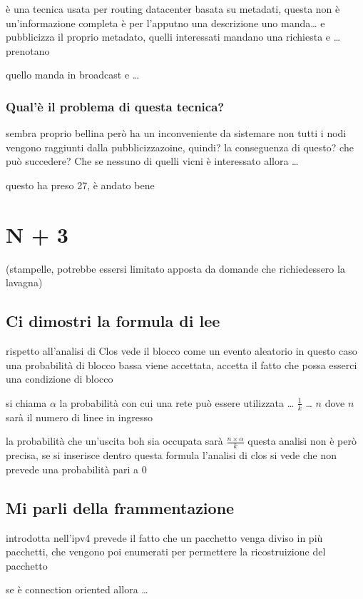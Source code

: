 \documentclass[11pt]{article}
\begin{document}
è una tecnica usata per routing datacenter basata su metadati, questa non è un'informazione completa è per l'apputno una descrizione
uno manda\ldots{} e pubblicizza il proprio metadato, quelli interessati mandano una richiesta e \ldots{} prenotano

quello manda in broadcast e \ldots{}

\subsubsection{Qual'è il problema di questa tecnica?}
\label{sec:org1149644}
sembra proprio bellina però ha un inconveniente da sistemare
non tutti i nodi vengono raggiunti dalla pubblicizzazoine, quindi?
la conseguenza di questo? che può succedere? Che se nessuno di quelli vicni è interessato allora \ldots{}

questo ha preso 27, è andato bene

\section{N + 3}
\label{sec:orgf4ae6d1}
(stampelle, potrebbe essersi limitato apposta da domande che richiedessero la lavagna)
\subsection{Ci dimostri la formula di lee}
\label{sec:orga0f925a}
rispetto all'analisi di Clos vede il blocco come un evento aleatorio
in questo caso una probabilità di blocco bassa viene accettata, accetta il fatto che possa esserci una condizione di blocco

si chiama \(\alpha\) la probabilità con cui una rete può essere utilizzata \ldots{} \(\frac{1}{k}\) \ldots{} \(n\) dove \(n\) sarà il numero di linee in ingresso

la probabilità che un'uscita boh sia occupata sarà \(\frac{n \times \alpha}{k}\)
questa analisi non è però precisa, se si inserisce dentro questa formula l'analisi di clos si vede che non prevede una probabilità pari a \(0\)

\subsection{Mi parli della frammentazione}
\label{sec:org7b544c9}
introdotta nell'ipv4
prevede il fatto che un pacchetto venga diviso in più pacchetti, che vengono poi enumerati per permettere la ricostruizione del pacchetto

se è connection oriented allora \ldots{}
\end{document}
